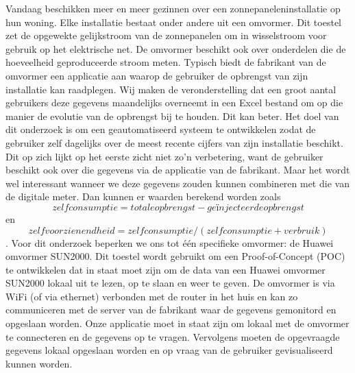 \documentclass{hogent-article}
\begin{document}
    Vandaag beschikken meer en meer gezinnen over een zonnepaneleninstallatie op hun woning. Elke installatie bestaat onder andere uit een omvormer. Dit toestel zet de opgewekte gelijkstroom van de zonnepanelen om in wisselstroom voor gebruik op het elektrische net. De omvormer beschikt ook over onderdelen die de hoeveelheid geproduceerde stroom meten. Typisch biedt de fabrikant van de omvormer een applicatie aan waarop de gebruiker de opbrengst van zijn installatie kan raadplegen. Wij maken de veronderstelling dat een groot aantal gebruikers deze gegevens maandelijks overneemt in een Excel bestand om op die manier de evolutie van de opbrengst bij te houden.\newline
    Dit kan beter. Het doel van dit onderzoek is om een geautomatiseerd systeem te ontwikkelen zodat de gebruiker zelf dagelijks over de meest recente cijfers van zijn installatie beschikt. Dit op zich lijkt op het eerste zicht niet zo'n verbetering, want de gebruiker beschikt ook over die gegevens via de applicatie van de fabrikant. Maar het wordt wel interessant wanneer we deze gegevens zouden kunnen combineren met die van de digitale meter. Dan kunnen er waarden berekend worden zoals \begin{equation*}zelfconsumptie = totale opbrengst - geïnjecteerde opbrengst\end{equation*} en \begin{equation*}zelfvoorzienendheid = zelfconsumptie / (zelfconsumptie + verbruik)\end{equation*}.\newline
    Voor dit onderzoek beperken we ons tot één specifieke omvormer: de Huawei omvormer SUN2000. Dit toestel wordt gebruikt om een Proof-of-Concept (POC) te ontwikkelen dat in staat moet zijn om de data van een Huawei omvormer SUN2000 lokaal uit te lezen, op te slaan en weer te geven.\newline
    De omvormer is via WiFi (of via ethernet) verbonden met de router in het huis en kan zo communiceren met de server van de fabrikant waar de gegevens gemonitord en opgeslaan worden. Onze applicatie moet in staat zijn om lokaal met de omvormer te connecteren en de gegevens op te vragen. Vervolgens moeten de opgevraagde gegevens lokaal opgeslaan worden en op vraag van de gebruiker gevisualiseerd kunnen worden.\newline
\end{document}
